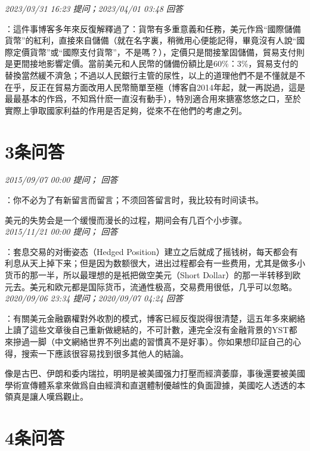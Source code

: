 \documentclass[twocolumn]{ctexart}
\begin{document}
\textit{\hfill\noindent\small 2023/03/31 16:23 提问；2023/04/01 03:48 回答}

：這件事博客多年來反復解釋過了：貨幣有多重意義和任務，美元作爲“國際儲備貨幣”的紅利，直接來自儲備（就在名字裏，稍微用心便能記得，畢竟沒有人說“國際定價貨幣”或“國際支付貨幣”，不是嗎？），定價只是間接鞏固儲備，貿易支付則是更間接地影響定價。當前美元和人民幣的儲備份額比是60\%：3\%，貿易支付的替換當然緩不濟急；不過以人民銀行主管的尿性，以上的道理他們不是不懂就是不在乎，反正在貿易方面改用人民幣簡單至極（博客自2014年起，就一再説過，這是最最基本的作爲，不知爲什麽一直沒有動手），特別適合用來搪塞悠悠之口，至於實際上爭取國家利益的作用是否足夠，從來不在他們的考慮之列。
\\

\section{3条问答}

\textit{\hfill\noindent\small 2015/09/07 00:00 提问； 回答}

：你不必为了有新留言而留言；不须回答留言时，我比较有时间读书。

美元的失势会是一个缓慢而漫长的过程，期间会有几百个小步骤。\\

\textit{\hfill\noindent\small 2015/11/21 00:00 提问； 回答}

：套息交易的对衝姿态（Hedged Position）建立之后就成了摇钱树，每天都会有利息从天上掉下来；但是因为数额很大，进出过程都会有一些费用，尤其是做多小货币的那一半，所以最理想的是衹把做空美元（Short Dollar）的那一半转移到欧元去。美元和欧元都是国际货币，流通性极高，交易费用很低，几乎可以忽略。\\

\textit{\hfill\noindent\small 2020/09/06 23:34 提问；2020/09/07 04:24 回答}

：有關美元金融霸權對外收割的模式，博客已經反復説得很清楚，這五年多來網絡上讀了這些文章後自己重新做總結的，不可計數，連完全沒有金融背景的YST都來摻過一脚（中文網絡世界不列出處的習慣真不是好事）。你如果想印証自己的心得，搜索一下應該很容易找到很多其他人的結論。

像是古巴、伊朗和委内瑞拉，明明是被美國强力打壓而經濟萎靡，事後還要被美國學術宣傳體系拿來做爲自由經濟和直選體制優越性的負面證據，美國吃人透透的本領真是讓人嘆爲觀止。
\\

\section{4条问答}
\end{document}
